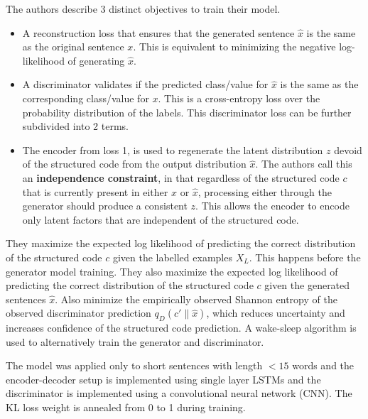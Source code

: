 The authors describe 3 distinct objectives to train their model.
\begin{itemize}
	\item A reconstruction loss that ensures that the generated sentence $\hat{x}$ is the same as the original sentence $x$. This is equivalent to minimizing the negative log-likelihood of generating $\hat{x}$.
	\item A discriminator validates if the predicted class/value for $\hat{x}$ is the same as the corresponding class/value for $x$. This is a cross-entropy loss over the probability distribution of the labels. This discriminator loss can be further subdivided into 2 terms.
	\item The encoder from loss 1, is used to regenerate the latent distribution $z$ devoid of the structured code from the output distribution $\hat{x}$. The authors call this an \textbf{independence constraint}, in that regardless of the structured code $c$ that is currently present in either $x$ or $\hat{x}$, processing either through the generator should produce a consistent $z$. This allows the encoder to encode only latent factors that are independent of the structured code.
\end{itemize}

They maximize the expected log likelihood of predicting the correct distribution of the structured code $c$ given the labelled examples $X_L$. This happens before the generator model training. They also maximize the expected log likelihood of predicting the correct distribution of the structured code $c$ given the generated sentences $\hat{x}$. Also minimize the empirically observed Shannon entropy of the observed discriminator prediction $q_D(c'\|\hat{x})$, which reduces uncertainty and increases confidence of the structured code prediction. A wake-sleep algorithm \citep{hinton1995wake} is used to alternatively train the generator and discriminator.

The model was applied only to short sentences with length $<15$ words and the encoder-decoder setup is implemented using single layer LSTMs and the discriminator is implemented using a convolutional neural network (CNN). The KL loss weight is annealed from 0 to 1 during training.


\section{}

